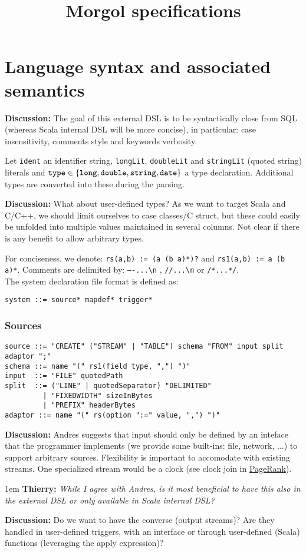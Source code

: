 \documentclass[11pt]{article}
\title{Morgol specifications}
\newlength{\dlen}
\def\discuss#1{\par\hspace{2em}
\setlength{\dlen}{\textwidth}
\addtolength{\dlen}{-2em}
\begin{minipage}{\dlen}\footnotesize {\bf\color{red} Discussion:} #1\end{minipage}\par}
\def\say#1#2{\begingroup\par\leftskip1em {\bf #1:} \it #2\par\endgroup}
\begin{document}
\section*{Language syntax and associated semantics}
\discuss{The goal of this external DSL is to be syntactically close from SQL (whereas Scala internal DSL will be more concise), in particular: case insensitivity, comments style and keywords verbosity.}
Let {\tt ident} an identifier string, {\tt longLit}, {\tt doubleLit} and {\tt stringLit} (quoted string) literals and ${\tt type}\in\{{\tt long}, {\tt double}, {\tt string}, {\tt date}\}$ a type declaration. Additional types are converted into these during the parsing.
\discuss{What about user-defined types? As we want to target Scala and C/C++, we should limit ourselves to case classes/C struct, but these could easily be unfolded into multiple values maintained in several columns. Not clear if there is any benefit to allow arbitrary types.}
For conciseness, we denote: \verb$rs(a,b) := (a (b a)*)?$ and \verb$rs1(a,b) := a (b a)*$. Comments are delimited by: {\tt ----...\textbackslash n} , {\tt //...\textbackslash n} or {\tt /*...*/}.\\
The system declaration file format is defined as:
\begin{verbatim}
system ::= source* mapdef* trigger*
\end{verbatim}

\subsubsection*{Sources}
\begin{verbatim}
source ::= "CREATE" ("STREAM" | "TABLE") schema "FROM" input split adaptor ";"
schema ::= name "(" rs1(field type, ",") ")"
input  ::= "FILE" quotedPath
split  ::= ("LINE" | quotedSeparator) "DELIMITED"
         | "FIXEDWIDTH" sizeInBytes
         | "PREFIX" headerBytes
adaptor ::= name "(" rs(option ":=" value, ",") ")"
\end{verbatim}

\discuss{Andres suggests that input should only be defined by an inteface that the programmer implements (we provide some built-ins: file, network, ...) to support arbitrary sources. Flexibility is important to accomodate with existing streams. One specialized stream would be a clock (see clock join in \hyperref[pb:pagerank]{PageRank}).
\say{Thierry}{While I agree with Andres, is it most beneficial to have this also in the external DSL or only available in Scala internal DSL?}
}
\discuss{Do we want to have the converse (output streams)? Are they handled in user-defined triggers, with an interface or through user-defined (Scala) functions (leveraging the apply expression)?}
\end{document}
